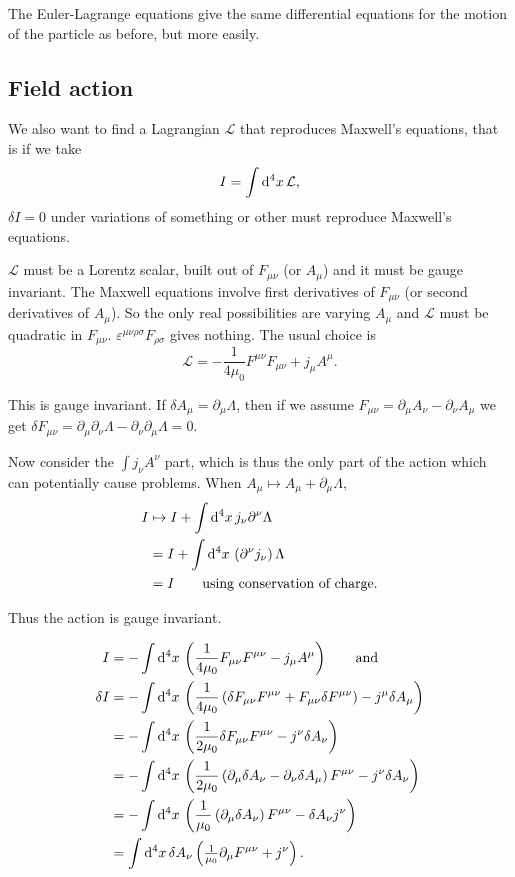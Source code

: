 \documentclass{notes}
\newcommand{\cL}{\mathcal{L}}
\begin{document}
The Euler-Lagrange equations give the same differential equations for the
motion of the particle as before, but more easily.

\subsection{Field action}

We also want to find a Lagrangian $\cL$ that reproduces Maxwell's equations,
that is if we take
\[
I = \int \ud^4 x\, \cL,
\]
$\delta I = 0$ under variations of something or other must
reproduce Maxwell's equations.

$\cL$ must be a Lorentz scalar, built out of $F_{\mu \nu}$ (or $A_\mu$)
and it must be gauge invariant.  The Maxwell equations involve first
derivatives of $F_{\mu \nu}$ (or second derivatives of $A_\mu$).  So the
only real possibilities are varying $A_\mu$ and $\cL$ must be quadratic
in $F_{\mu \nu}$.  $\varepsilon^{\mu \nu \rho \sigma} F_{\rho \sigma}$
gives nothing.  The usual choice is
\[
\cL = - \frac{1}{4 \mu_0} F^{\mu \nu} F_{\mu \nu} + j_{\mu} A^\mu.
\]

This is gauge invariant.  If $\delta A_\mu = \partial_\mu \Lambda$, then if
we assume $F_{\mu \nu} = \partial_\mu A_\nu - \partial_\nu A_\mu$ we get
$\delta F_{\mu \nu} = \partial_\mu \partial_\nu \Lambda - \partial_\nu
\partial_\mu \Lambda = 0$.

Now consider the $\int j_\nu A^\nu$ part, which is thus the only part
of the action which can potentially cause problems.  When $A_\mu
\mapsto A_\mu + \partial_\mu \Lambda$,
\begin{align*}
I &\mapsto I + \int \mathrm{d}^4 x\, j_\nu \partial^\nu \Lambda \\
&=I + \int \mathrm{d}^4 x\, \left(\partial^\nu j_\nu\right) \Lambda \\
&=I \qquad \text{using conservation of charge.}
\end{align*}

Thus the action is gauge invariant.

\begin{align*}
I &= - \int \mathrm{d}^4 x \, \left(\frac{1}{4 \mu_0} F_{\mu \nu} F^{\mu \nu} -
j_\mu A^\mu \right) \qquad \text{and} \\
\delta I &= - \int \mathrm{d}^4 x \, \left(\frac{1}{4 \mu_0}
\left( \delta F_{\mu \nu} F^{\mu \nu} + F_{\mu \nu} \delta F^{\mu \nu}
\right) - j^\mu \delta A_\mu \right) \\
&= - \int \mathrm{d}^4 x \, \left(\frac{1}{2 \mu_0} \delta F_{\mu \nu} F^{\mu \nu}
- j^\nu \delta A_\nu \right)\\
&= - \int \mathrm{d}^4 x \, \left( \frac{1}{2 \mu_0} \left(
\partial_\mu \delta A_\nu - \partial_\nu \delta A_\mu
\right) F^{\mu \nu}
- j^\nu \delta A_\nu \right) \\
&= - \int \mathrm{d}^4 x \, \left(
\frac{1}{\mu_0} \left( \partial_\mu \delta A_\nu \right) F^{\mu \nu}
- \delta A_\nu j^\nu \right) \\
&= \int \mathrm{d}^4 x \, \delta A_\nu \left( \tfrac{1}{\mu_0} \partial_\mu
F^{\mu \nu} + j^\nu \right).
\end{align*}
\end{document}
